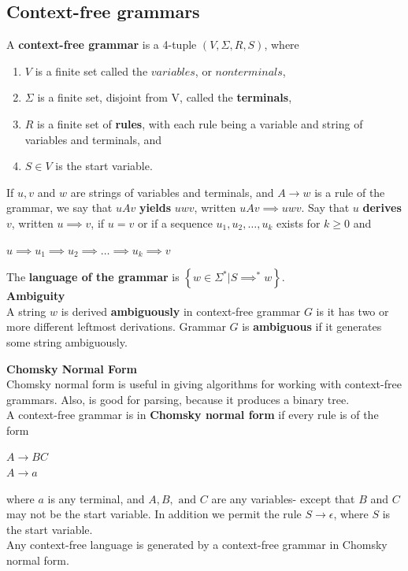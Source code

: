 \documentclass[a4paper]{article}
\begin{document}
\subsection{Context-free grammars} %
\label{sub:Context-free grammars}
A {\bf context-free grammar} is a 4-tuple $(V,\Sigma,R,S)$, where
\begin{enumerate}
  \item $V$ is a finite set called the $variables$, or $nonterminals$,
  \item $\Sigma$ is a finite set, disjoint from V, called the {\bf terminals},
  \item $R$ is a finite set of {\bf rules}, with each rule being a variable and string of variables and terminals, and
  \item $S \in V$ is the start variable.
\end{enumerate}
If $u,v$ and $w$ are strings of variables and terminals, and $A \rightarrow w$ is a rule of the grammar, we say that $uAv$ 
{\bf yields} $uwv$, written $uAv \implies uwv$. Say that $u$ {\bf derives} $v$, written $u \implies v$, if $u=v$ or if a sequence
$u_1,u_2,\dots,u_k$ exists for $k \geq 0$ and 
\begin{center}
  $u \implies u_1 \implies u_2 \implies \dots \implies u_k \implies v$
\end{center}
The {\bf language of the grammar} is $\left\{ w \in \Sigma^* | S \implies^* w \right\}$. \\

{\bf Ambiguity} \\
A string $w$ is derived {\bf ambiguously} in context-free grammar $G$ is it has two or more different leftmost
derivations. Grammar $G$ is {\bf ambiguous} if it generates some string ambiguously.

{\bf Chomsky Normal Form} \\
Chomsky normal form is useful in giving algorithms for working with context-free grammars. Also, is good for parsing, because it 
produces a binary tree. \\
A context-free grammar is in {\bf Chomsky normal form} if every rule is of the form \\
\begin{center}
  $ A \rightarrow BC$ \\
  $ A \rightarrow a$ \\
\end{center}
where $a$ is any terminal, and $A,B, \text{ and } C$ are any variables- except that $B$ and $C$ may not be the start variable.
In addition we permit the rule $S \rightarrow \epsilon$, where $S$ is the start variable. \\
Any context-free language is generated by a context-free grammar in Chomsky normal form.
\end{document}
